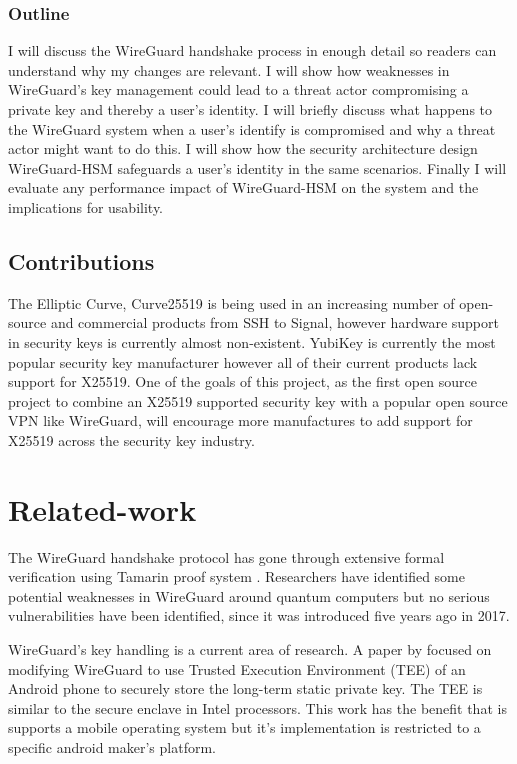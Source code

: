 \documentclass [11pt, proquest] {uwthesis}[2020/02/24]
\begin{document}
\subsection{Outline}
I will discuss the WireGuard handshake process in enough detail so readers can understand why my changes are relevant.
I will show how weaknesses in WireGuard's key management could lead to a threat actor compromising a private key and thereby a user's identity. 
I will briefly discuss what happens to the WireGuard system when a user's identify is compromised and why a threat actor might want to do this.
I will show how the security architecture design WireGuard-HSM safeguards a user's identity in the same scenarios.
Finally I will evaluate any performance impact of WireGuard-HSM on the system and the implications for usability.



\section {Contributions}
The Elliptic Curve, Curve25519 is being used in an increasing number of open-source and commercial products from SSH to Signal\cite{noauthor_things_2022}, however hardware support in 
security keys is currently almost non-existent. YubiKey is currently the most popular security key manufacturer however all of their current products 
lack support for X25519. One of the goals of this project, as the first open source project to combine an X25519 supported security key with a popular open source VPN like WireGuard, will encourage more manufactures to add support for X25519 across the security key industry.

\chapter {Related-work}
\label{related_work}
The WireGuard handshake protocol has gone through extensive formal verification using Tamarin proof system \cite{donenfeld_formal_2018}. Researchers have identified some potential weaknesses in WireGuard around quantum computers\cite{hulsing_post-quantum_2021} but no serious vulnerabilities have been identified, since it was introduced five years ago in 2017.

WireGuard's key handling is a current area of research. A paper by \cite{wu_sewg_2020} focused on modifying WireGuard to use Trusted Execution Environment (TEE) of an Android phone to securely store the long-term static private key. The TEE is similar to the secure enclave in Intel processors. This work has the benefit that is supports a mobile operating system but it's implementation is restricted to a specific android maker's platform.
\end{document}
